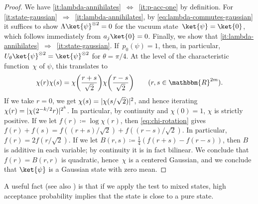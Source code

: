 \documentclass[11pt,a4paper]{article}
\numberwithin{equation}{section}
\newcommand{\ot}{\otimes}
\newcommand{\RR}{\mathbbm{R}}
\newcommand{\1}{\mathbf{1}}
\DeclarePairedDelimiter\abs{\lvert}{\rvert}
\begin{document}
\begin{proof}
    We have \ref{it:lambda-annihilates}~$\Leftrightarrow$~\ref{it:p-acc-one} by definition.
    For \ref{it:state-gaussian}~$\Rightarrow$~\ref{it:lambda-annihilates}, by \cref{eq:lambda-commutes-gaussian} it suffices to show $\Lambda \ket{\psi}^{\ot 2} = 0$ for the vacuum state~$\ket{\psi} = \ket{0}$, which follows immediately from $a_j \ket{0} = 0$.
    Finally, we show that \ref{it:lambda-annihilates}~$\Rightarrow$~\ref{it:state-gaussian}.
    If~$p_0(\psi)=1$, then, in particular, $U_\theta \ket{\psi}^{\ot 2} = \ket{\psi}^{\ot 2}$ for $\theta = \pi/4$.
    At the level of the characteristic function~$\chi$ of $\psi$, this translates to
    \begin{align}\label{eq:chi-rotation}
        \chi(r)\chi(s) = \chi\mleft(\frac{r+s}{\sqrt2}\mright)\chi\mleft(\frac{r-s}{\sqrt2}\mright) \qquad (r, s \in \RR^{2m}).
    \end{align}
    If we take $r=0$, we get $\chi(s) = \abs{\chi(s/\sqrt2)}^2$, and hence iterating $\chi(r) = \abs{\chi(2^{-k/2} r)}^{2^k}$.
    In particular, by continuity and $\chi(0) = 1$, $\chi$ is strictly positive.
    If we let $f(r) \coloneqq \log \chi(r)$, then \cref{eq:chi-rotation} gives $f(r) + f(s) = f((r+s)/\sqrt2) + f((r-s)/\sqrt2)$.
    In particular, $f(r) = 2 f(r/\sqrt2)$.
    If we let $B(r,s) \coloneqq \frac14(f(r+s) - f(r-s))$, then $B$ is additive in each variable; %
    by continuity it is in fact bilinear.
    We conclude that $f(r) = B(r,r)$ is quadratic, hence~$\chi$ is a centered Gaussian, and we conclude that $\ket{\psi}$ is a Gaussian state with zero mean.
\end{proof}

A useful fact (see also \cite[Lem.~30]{girardi2025gaussian}) is that if we apply the test to mixed states, high acceptance probability implies that the state is close to a pure state.
\end{document}
